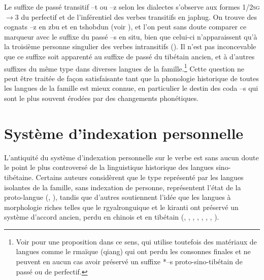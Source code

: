 \documentclass[oldfontcommands,oneside,a4paper,11pt]{article}
\newcommand{\ipa}[1]{{\phon \mbox{#1}}} %
\begin{document}
Le suffixe de passé transitif \ipa{--t} ou \ipa{--z} selon les dialectes s'observe aux formes \textsc{1/2sg}$\rightarrow$3 du perfectif et de l'inférentiel  des verbes transitifs en japhug. On trouve des cognats \ipa{--z} en zbu et en tshobdun (voir \citealt{jackson14morpho}), et l'on peut sans doute comparer ce marqueur avec le suffixe du passé \ipa{--s} en situ, bien que celui-ci n'apparaissent qu'à la troisième personne singulier des verbes intransitifs (\citealt{linyj03tense}). Il n'est pas inconcevable que ce suffixe soit apparenté au suffixe de passé du tibétain ancien, et à d'autres suffixes du même type dans diverses langues de la famille.\footnote{Voir \citet{huangbf97s.houzhui} pour une proposition dans ce sens, qui utilise toutefois des matériaux de langues comme le rmaïque (qiang) qui ont perdu les consonnes finales et ne peuvent en aucun cas avoir préservé un suffixe *--s proto-sino-tibétain de passé ou de perfectif.} Cette question ne peut être traitée de façon satisfaisante tant que la phonologie historique de toutes les langues de la famille est mieux connue, en particulier le destin des coda --s qui sont le plus souvent érodées par des changements phonétiques.

\section{Système d'indexation personnelle}

L'antiquité du système d'indexation personnelle sur le verbe est sans aucun doute le point le plus controversé de la linguistique historique des langues sino-tibétaine. Certains auteurs considèrent que le type représenté par les langues isolantes de la famille, sans indexation de personne, représentent l'état de la proto-langue (\citealt{lapolla92}, \citealt{lapolla03, lapolla12comments}), tandis que d'autres soutiennent l'idée que les langues à morphologie riches telles que le rgyalronguique et le kiranti ont préservé un système d'accord ancien, perdu en chinois et en tibétain (\citealt{bauman75}, \citealt{driem93agreement}, \citealt{delancey89agreement}, \citealt{delancey10agreement}, \citealt{delancey11prefixes},  \citealt{delancey14second}, \citealt{jacques10zos}, \citealt{jacques12agreement}).
   
\end{document}
